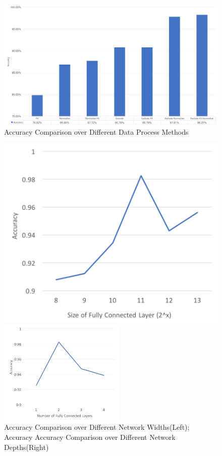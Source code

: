 \documentclass[a4paper, 11pt]{article} %
\begin{document}
\begin{figure}[H]
\centerline{\includegraphics[width=\linewidth ]{figure/acc-data}}
\caption{Accuracy Comparison over Different Data Process Methods}
\label{fig_f0fit}
\end{figure}

\begin{figure}[H]
\begin{minipage}{0.5\linewidth}
\centerline{\includegraphics[width=\linewidth ]{figure/acc-width}}
\end{minipage}
\hfill
\begin{minipage}{0.5\linewidth}
\centerline{\includegraphics[width=6.0cm]{figure/acc-depth}}
\end{minipage}
\caption{Accuracy Comparison over Different Network Widths(Left);
Accuracy Accuracy Comparison over Different Network Depths(Right)}
\label{fig_f0fit}
\end{figure}
\end{document}
